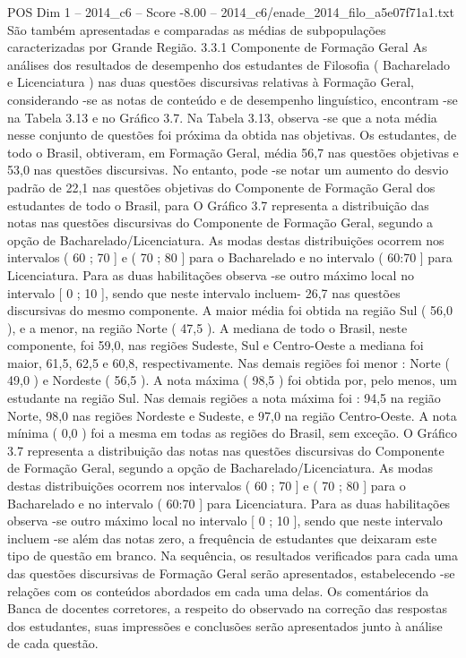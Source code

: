 \begin{textsample}{POS Dim 1 – 2014\_c6 – Score -8.00 – 2014\_c6/enade\_2014\_filo\_a5e07f71a1.txt}
São também apresentadas e comparadas as médias de subpopulações caracterizadas por Grande Região. 3.3.1 Componente de Formação Geral As análises dos resultados de desempenho dos estudantes de Filosofia ( Bacharelado e Licenciatura ) nas duas questões discursivas relativas à Formação Geral, considerando -se as notas de conteúdo e de desempenho linguístico, encontram -se na Tabela 3.13 e no Gráfico 3.7.
Na Tabela 3.13, observa -se que a nota média nesse conjunto de questões foi próxima da obtida nas objetivas.
Os estudantes, de todo o Brasil, obtiveram, em Formação Geral, média 56,7 nas questões objetivas e 53,0 nas questões discursivas.
No entanto, pode -se notar um aumento do desvio padrão de 22,1 nas questões objetivas do Componente de Formação Geral dos estudantes de todo o Brasil, para O Gráfico 3.7 representa a distribuição das notas nas questões discursivas do Componente de Formação Geral, segundo a opção de Bacharelado/Licenciatura.
As modas destas distribuições ocorrem nos intervalos ( 60 ; 70 ] e ( 70 ; 80 ] para o Bacharelado e no intervalo ( 60:70 ] para Licenciatura.
Para as duas habilitações observa -se outro máximo local no intervalo [ 0 ; 10 ], sendo que neste intervalo incluem- 26,7 nas questões discursivas do mesmo componente.
A maior média foi obtida na região Sul ( 56,0 ), e a menor, na região Norte ( 47,5 ).
A mediana de todo o Brasil, neste componente, foi 59,0, nas regiões Sudeste, Sul e Centro-Oeste a mediana foi maior, 61,5, 62,5 e 60,8, respectivamente.
Nas demais regiões foi menor : Norte ( 49,0 ) e Nordeste ( 56,5 ).
A nota máxima ( 98,5 ) foi obtida por, pelo menos, um estudante na região Sul.
Nas demais regiões a nota máxima foi : 94,5 na região Norte, 98,0 nas regiões Nordeste e Sudeste, e 97,0 na região Centro-Oeste.
A nota mínima ( 0,0 ) foi a mesma em todas as regiões do Brasil, sem exceção.
O Gráfico 3.7 representa a distribuição das notas nas questões discursivas do Componente de Formação Geral, segundo a opção de Bacharelado/Licenciatura.
As modas destas distribuições ocorrem nos intervalos ( 60 ; 70 ] e ( 70 ; 80 ] para o Bacharelado e no intervalo ( 60:70 ] para Licenciatura.
Para as duas habilitações observa -se outro máximo local no intervalo [ 0 ; 10 ], sendo que neste intervalo incluem -se além das notas zero, a frequência de estudantes que deixaram este tipo de questão em branco.
Na sequência, os resultados verificados para cada uma das questões discursivas de Formação Geral serão apresentados, estabelecendo -se relações com os conteúdos abordados em cada uma delas.
Os comentários da Banca de docentes corretores, a respeito do observado na correção das respostas dos estudantes, suas impressões e conclusões serão apresentados junto à análise de cada questão.

\end{textsample}
